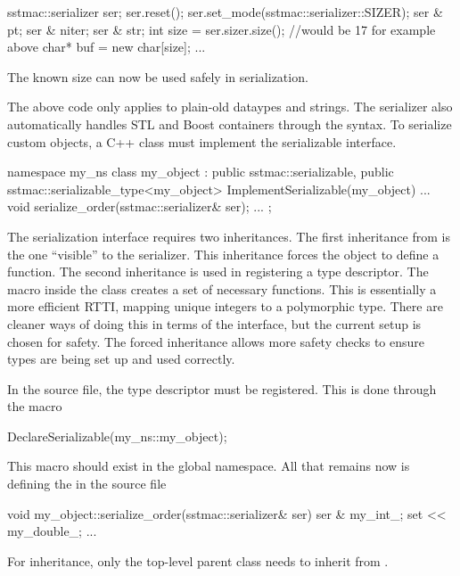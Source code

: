 \begin{CppCode}
sstmac::serializer ser;
ser.reset();
ser.set_mode(sstmac::serializer::SIZER);
ser & pt;
ser & niter;
ser & str;
int size = ser.sizer.size(); //would be 17 for example above
char* buf = new char[size];
...
\end{CppCode}
The known size can now be used safely in serialization.

The above code only applies to plain-old dataypes and strings.
The serializer also automatically handles STL and Boost containers
through the \inlinecode{<<} syntax.
To serialize custom objects, a C++ class must implement the serializable interface.

\begin{CppCode}
namespace my_ns {
class my_object : 
  public sstmac::serializable,
  public sstmac::serializable_type<my_object>
{
 ImplementSerializable(my_object)
 ...
 void
 serialize_order(sstmac::serializer& ser);
 ...
};
}
\end{CppCode}
The serialization interface requires two inheritances.
The first inheritance from  is the one ``visible'' to the serializer.
This inheritance forces the object to define a  function.
The second inheritance is used in registering a type descriptor.
The macro  inside the class creates a set of necessary functions.
This is essentially a more efficient RTTI, mapping unique integers to a polymorphic type.
There are cleaner ways of doing this in terms of the interface,
but the current setup is chosen for safety.
The forced inheritance allows more safety checks to ensure types are being set up and used correctly.

In the source file, the type descriptor must be registered.
This is done through the macro

\begin{CppCode}
DeclareSerializable(my_ns::my_object);
\end{CppCode}
This macro should exist in the global namespace.
All that remains now is defining the  in the source file

\begin{CppCode}
void
my_object::serialize_order(sstmac::serializer& ser)
{
  ser & my_int_;
  set << my_double_;
  ...
}
\end{CppCode}

For inheritance, only the top-level parent class needs to inherit from .

